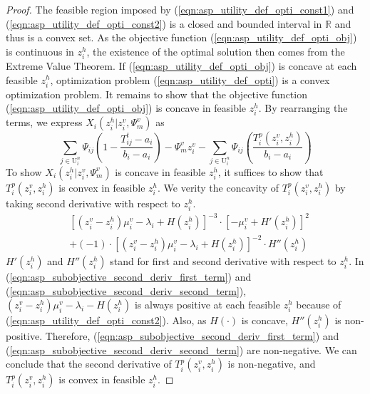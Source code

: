 \documentclass[conference]{IEEEtran}
\begin{document}
\begin{proof}
The feasible region imposed by (\ref{eqn:asp_utility_def_opti_const1}) and (\ref{eqn:asp_utility_def_opti_const2}) is a closed and bounded interval in $\mathbb{R}$ and thus is a convex set. As the objective function (\ref{eqn:asp_utility_def_opti_obj}) is continuous in $z_i^h$, the existence of the optimal solution then comes from the Extreme Value Theorem. If (\ref{eqn:asp_utility_def_opti_obj}) is concave at each feasible $z_i^h$, optimization problem (\ref{eqn:asp_utility_def_opti}) is a convex optimization problem. It remains to show that the objective function (\ref{eqn:asp_utility_def_opti_obj}) is concave in feasible $z_i^h$. By rearranging the terms, we express $X_i(z_i^h|z_i^v,\Psi_m^v)$ as 
\begin{equation}
\sum_{j \in \mathrm{U}_i^n}\Psi_{ij}(1-\frac{T_{ij}^t -a_i}{b_i-a_i})- \Psi_m^v z_i^v - \sum_{j \in \mathrm{U}_i^n}\Psi_{ij}(\frac{T_i^p(z_i^v, z_i^h)}{b_i-a_i})
\end{equation}
 To show $X_i(z_i^h|z_i^v,\Psi_m^v)$ is concave in feasible $z_i^h$, it suffices to show that $T_i^p(z_i^v, z_i^h)$ is convex in feasible $z_i^h$. We verity the concavity of $T_i^p(z_i^v, z_i^h)$ by taking second derivative with respect to $z_i^h$. 
\begin{subequations}\label{eqn:asp_subobjective_second_deriv}
     \begin{alignat}{1}
       &[(z_i^v- z_i^h)\mu_i^v - \lambda_i + H(z_i^h)]^{-3} \cdot [-\mu_i^v+H'(z_i^h)]^2 \label{eqn:asp_subobjective_second_deriv_first_term} \\
       &+ (-1) \cdot [(z_i^v-z_i^h)\mu_i^v - \lambda_i + H(z_i^h)]^{-2} \cdot H''(z_i^h) \label{eqn:asp_subobjective_second_deriv_second_term}
     \end{alignat}
\end{subequations}
$H'(z_i^h)$ and $H''(z_i^h)$ stand for first and second derivative with respect to $z_i^h$. In (\ref{eqn:asp_subobjective_second_deriv_first_term}) and (\ref{eqn:asp_subobjective_second_deriv_second_term}), $(z_i^v- z_i^h)\mu_i^v - \lambda_i - H(z_i^h)$ is always positive at each feasible $z_i^h$ because of (\ref{eqn:asp_utility_def_opti_const2}). Also, as $H(\cdot)$ is concave, $H''(z_i^h)$ is non-positive. Therefore, (\ref{eqn:asp_subobjective_second_deriv_first_term}) and (\ref{eqn:asp_subobjective_second_deriv_second_term}) are non-negative. We can conclude that the second derivative of $T_i^p(z_i^v, z_i^h)$ is non-negative, and $T_i^p(z_i^v, z_i^h)$ is convex in feasible $z_i^h$. 
\end{proof}
\end{document}
